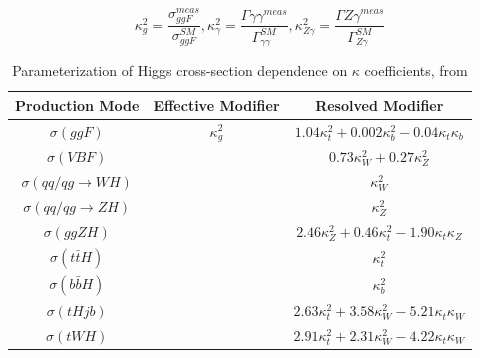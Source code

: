 \begin{equation}
\kappa_{g}^{2} = \frac{\sigma_{ggF}^{meas}}{\sigma_{ggF}^{SM}}, \kappa_{\gamma}^{2} = \frac{\Gamma{\gamma \gamma}^{meas}}{\Gamma_{\gamma \gamma}^{SM}}, \kappa_{Z \gamma}^{2} = \frac{\Gamma{Z \gamma}^{meas}}{\Gamma_{Z \gamma}^{SM}}
\end{equation}

\begin{table}[h]
    \centering
    \begin{tabular}{ccc}
	Production Mode & Effective Modifier & Resolved Modifier \\ \hline
	$\sigma(ggF)$ & $\kappa_{g}^{2}$ & $1.04 \kappa_{t}^{2} + 0.002 \kappa_{b}^2 - 0.04 \kappa_{t} \kappa_{b}$ \\
	$\sigma(VBF)$ & & $0.73 \kappa_{W}^{2} + 0.27 \kappa_{Z}^2$ \\
	$\sigma(qq/qg \rightarrow W H)$ & & $\kappa_{W}^{2}$ \\
	$\sigma(qq/qg \rightarrow ZH)$ & & $\kappa_{Z}^{2}$\\
	$\sigma(ggZH)$ && $2.46 \kappa_{Z}^{2} + 0.46 \kappa_{t}^2 - 1.90 \kappa_{t} \kappa_{Z}$ \\
	$\sigma(t\bar{t}H)$ && $\kappa_{t}^{2}$ \\
	$\sigma(b\bar{b}H)$ && $\kappa_{b}^{2}$ \\
	$\sigma(tHjb)$ && $2.63 \kappa_{t}^{2} + 3.58 \kappa_{W}^2 - 5.21 \kappa_{t} \kappa_{W}$ \\
	$\sigma(tWH)$ && $2.91 \kappa_{t}^{2} + 2.31 \kappa_{W}^2 - 4.22 \kappa_{t} \kappa_{W}$ \\
    \end{tabular}
    \caption{Parameterization of Higgs cross-section dependence on $\kappa$ coefficients, from \cite{PhysRevD.101.012002}}
    \label{Xsecskappa}
\end{table}

